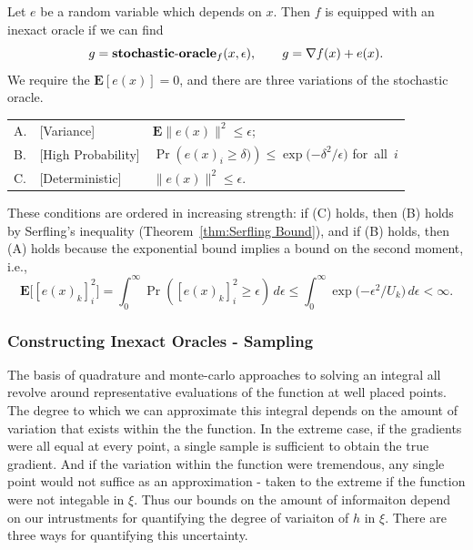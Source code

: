 \begin{defn} \label{defn: 0-1 Epsilon Oracle} Let $e$ be a 
random variable which depends on $x$. Then $f$ is equipped with an inexact oracle if we can find
$$
g=\mbox{{\bf stochastic}-{\bf oracle}}_f(x,\epsilon), \qquad g =\nabla f(x)+e(x).
$$
We require the $\mathbf{E}[e(x)] = 0$, and there are three variations of the
stochastic oracle.

\vspace{2mm}
\begin{tabular}{l@{\ }ll}
  A. &[Variance] &$\mathbf{E} \|e(x)\|^2 \leq \epsilon$;
  \\[6pt]
  B. &[High Probability] & $
  \Pr\left(e(x)_i \geq\delta) \right)
  \leq\exp\big({-\delta^{2}/\epsilon}\big)$ \quad \mbox{for all $i$}
\\[6pt]
C. &[Deterministic] &$\|e(x)\|^2 \leq \epsilon$.
\end{tabular}
\end{defn}

These conditions are ordered in increasing strength: if (C) holds,
then (B) holds by Serfling's inequality
(Theorem~\ref{thm:Serfling Bound}), and if (B) holds, then
(A) holds because the exponential bound implies a bound on the second
moment, i.e.,
\[
\mathbf{E} \big[[e(x)_{k}]_{i}^{2}\big] = \int_{0}^{\infty}\!\! 
\Pr([e(x)_{k}]_{i}^{2} \geq \epsilon)\,d\epsilon \leq \int_{0}^{\infty}\!\!
\exp\big({-\epsilon^{2}/U_{k}}\big)\,d\epsilon < \infty.
\]

\subsubsection{Constructing Inexact Oracles - Sampling} The basis of
quadrature and monte-carlo approaches to solving an integral all revolve
around representative evaluations of the function at well placed points. The
degree to which we can approximate this integral depends on the amount of
variation that exists within the the function. In the extreme case, if the
gradients were all equal at every point, a single sample is sufficient to
obtain the true gradient. And if the variation within the function were
tremendous, any single point would not suffice as an approximation - taken
to the extreme if the function were not integable in $\xi$. Thus our bounds
on the amount of informaiton depend on our intrustments for quantifying
the degree of variaiton of $h$ in $\xi$. There are three ways for quantifying 
this uncertainty.

